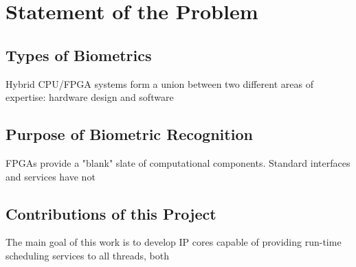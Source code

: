 \chapter{Statement of the Problem}
\label{sec:problem}

\section{Types of Biometrics} Hybrid CPU/FPGA systems form a
union between two different areas of expertise: hardware design and software

\section{Purpose of Biometric Recognition} FPGAs provide a "blank"
slate of computational components.  Standard interfaces and services have not

\section{Contributions of this Project} The main goal of this work is to develop
IP cores capable of providing run-time scheduling services to all threads, both
